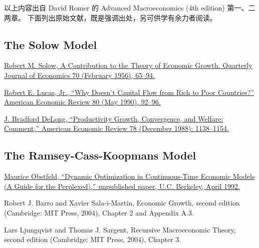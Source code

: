 \documentclass[cn,normal,11pt,black]{elegantnote}
\begin{document}
\quad \newline

以上内容出自 David Romer 的 Advanced Macroeconomics (4th edition) 第一、二两章。
下面列出原始文献，既是强调出处，另可供学有余力者阅读。

\subsection*{The Solow Model}

\href{http://www.jstor.org/stable/1884513}
{Robert M. Solow, A Contribution to the Theory of Economic Growth. 
Quarterly Journal of Economics 70 (February 1956), 65–94.}

\href{http://www.jstor.org/stable/2006549}
{Robert E. Lucas, Jr., “Why Doesn’t Capital Flow from Rich to Poor Countries?”
American Economic Review 80 (May 1990), 92–96.}

\href{http://www.jstor.org/stable/1807174}
{J. Bradford DeLong, “Productivity Growth, Convergence, and Welfare: Comment,”
American Economic Review 78 (December 1988): 1138–1154.}

\subsection*{The Ramsey-Cass-Koopmans Model}

\href{http://www.econ.berkeley.edu/~obstfeld/ftp/perplexed/cts4a.pdf}
{Maurice Obstfeld, “Dynamic Optimization in Continuous-Time Economic Models
(A Guide for the Perplexed),” unpublished paper, U.C. Berkeley, April 1992.}

Robert J. Barro and Xavier Sala-i-Martin, Economic Growth, second edition
(Cambridge: MIT Press, 2004), Chapter 2 and Appendix A.3.

Lars Ljungqvist and Thomas J. Sargent, Recursive Macroeconomic Theory, second
edition (Cambridge: MIT Press, 2004), Chapter 3.

\newpage
\end{document}
